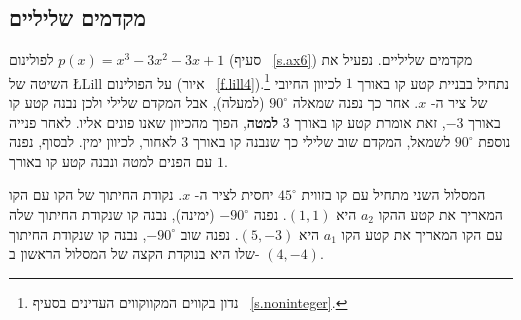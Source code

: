 \subsection{מקדמים שליליים}\label{s.negative}

לפולינום 
$p(x)=x^3-3x^2-3x+1$
(סעיף%
~\ref{s.ax6})
מקדמים שליליים. נפעיל את השיטה של 
\L{Lill}
על הפולינום (איור~%
\ref{f.lill4}).\footnote{%
נדון בקווים המקווקווים העדינים בסעיף%
~\ref{s.noninteger}.}
נתחיל בבניית קטע קו באורך
$1$
לכיוון החיובי של ציר ה-%
$x$. 
אחר כך נפנה שמאלה
$90^\circ$
(למעלה), אבל המקדם שלילי ולכן נבנה קטע קו באורך 
$-3$,
זאת אומרת קטע קו באורך
$3$
\textbf{למטה},
הפוך מהכיוון שאנו פונים אליו. לאחר פנייה נוספת
$90^\circ$
לשמאל, המקדם שוב שלילי כך שנבנה קו באורך
$3$
לאחור, לכיוון ימין. לבסוף, נפנה עם הפנים למטה ונבנה קטע קו באורך
$1$.

המסלול השני מתחיל עם קו בזווית
$45^\circ$
יחסית לציר ה-%
$x$.
נקודת החיתוך של הקו עם הקו המאריך את קטע ההקו
$a_2$
היא
$(1,1)$.
נפנה 
$-90^\circ$
(ימינה), נבנה קו שנקודת החיתוך שלה עם הקו המאריך את קטע הקו 
$a_1$
היא
$(5,-3)$.
נפנה שוב
 $-90^\circ$,
נבנה קו שנקודת החיתוך שלו היא בנוקדת הקצה של המסלול הראשון ב-%
$(4,-4)$.

